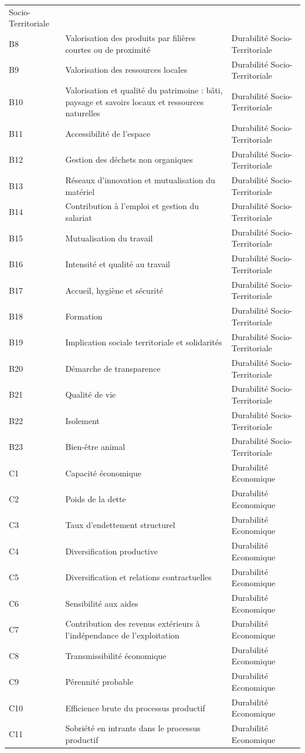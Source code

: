 \documentclass[]{article}
\begin{document}
\begin{longtable}[]{@{}lll@{}}
Socio-Territoriale\tabularnewline
B8 & Valorisation des produits par filières courtes ou de proximité &
Durabilité Socio-Territoriale\tabularnewline
B9 & Valorisation des ressources locales & Durabilité
Socio-Territoriale\tabularnewline
B10 & Valorisation et qualité du patrimoine : bâti, paysage et savoirs
locaux et ressources naturelles & Durabilité
Socio-Territoriale\tabularnewline
B11 & Accessibilité de l'espace & Durabilité
Socio-Territoriale\tabularnewline
B12 & Gestion des déchets non organiques & Durabilité
Socio-Territoriale\tabularnewline
B13 & Réseaux d'innovation et mutualisation du matériel & Durabilité
Socio-Territoriale\tabularnewline
B14 & Contribution à l'emploi et gestion du salariat & Durabilité
Socio-Territoriale\tabularnewline
B15 & Mutualisation du travail & Durabilité
Socio-Territoriale\tabularnewline
B16 & Intensité et qualité au travail & Durabilité
Socio-Territoriale\tabularnewline
B17 & Accueil, hygiène et sécurité & Durabilité
Socio-Territoriale\tabularnewline
B18 & Formation & Durabilité Socio-Territoriale\tabularnewline
B19 & Implication sociale territoriale et solidarités & Durabilité
Socio-Territoriale\tabularnewline
B20 & Démarche de transparence & Durabilité
Socio-Territoriale\tabularnewline
B21 & Qualité de vie & Durabilité Socio-Territoriale\tabularnewline
B22 & Isolement & Durabilité Socio-Territoriale\tabularnewline
B23 & Bien-être animal & Durabilité Socio-Territoriale\tabularnewline
C1 & Capacité économique & Durabilité Economique\tabularnewline
C2 & Poids de la dette & Durabilité Economique\tabularnewline
C3 & Taux d'endettement structurel & Durabilité
Economique\tabularnewline
C4 & Diversification productive & Durabilité Economique\tabularnewline
C5 & Diversification et relations contractuelles & Durabilité
Economique\tabularnewline
C6 & Sensibilité aux aides & Durabilité Economique\tabularnewline
C7 & Contribution des revenus extérieurs à l'indépendance de
l'exploitation & Durabilité Economique\tabularnewline
C8 & Transmissibilité économique & Durabilité Economique\tabularnewline
C9 & Pérennité probable & Durabilité Economique\tabularnewline
C10 & Efficience brute du processus productif & Durabilité
Economique\tabularnewline
C11 & Sobriété en intrants dans le processus productif & Durabilité
Economique\tabularnewline
\bottomrule
\end{longtable}
\end{document}
